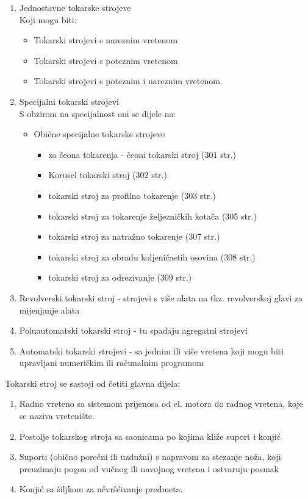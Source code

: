 \documentclass[a4paper,12pt]{article}
\numberwithin{figure}{section}
\begin{document}
\begin{enumerate}
\item Jednostavne tokarske strojeve\\
Koji mogu biti:
\begin{itemize}
\item Tokarski strojevi s nareznim vretenom
\item Tokarski strojevi s poteznim vretenom
\item Tokarski strojevi s poteznim i nareznim vretenom.
\end{itemize}
\item Specijalni tokarski strojevi\\
S obzirom na specijalnost oni se dijele na:
\begin{itemize}
\item Obične specijalne tokarske strojeve
\begin{itemize}
\item za čeona tokarenja - čeoni tokarski stroj (301 str.)
\item Korusel tokarski stroj (302 str.)
\item tokarski stroj za profilno tokarenje (303 str.)
\item tokarski stroj za tokarenje željezničkih kotača (305 str.)
\item tokarski stroj za natražno tokarenje (307 str.)
\item tokarski stroj za obradu koljeničastih osovina (308 str.)
\item tokarski stroj za odrezivanje (309 str.)
\end{itemize}
\end{itemize}
\item Revolverski tokarski stroj - strojevi s više alata na tkz. revolverskoj glavi za mijenjanje alata
\item Poluautomatski tokarski stroj - tu spadaju agregatni strojevi
\item Automatski tokarski strojevi - sa jednim ili više vretena koji mogu biti upravljani numeričkim ili računalnim programom
\end{enumerate}
Tokarski stroj se sastoji od četiti glavna dijela:
\begin{enumerate}
\item Radno vreteno sa sistemom prijenosa od el. motora do radnog vretena, koje se naziva vretenište.
\item Postolje tokarskog stroja sa saonicama po kojima kliže suport i konjić
\item Suporti (obično porečni ili uzdužni) s napravom za stezanje noža, koji preuzimaju pogon od vučnog ili navojnog vretena i ostvaruju posmak
\item Konjić sa šiljkom za učvršćivanje predmeta.
\end{enumerate}
\end{document}
